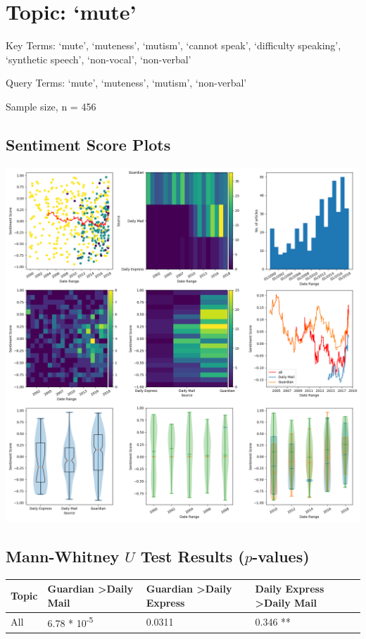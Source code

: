\documentclass{report}
\begin{document}
\newpage
\section{Topic: `mute'}
Key Terms: `mute', `muteness', `mutism', `cannot speak', `difficulty speaking', `synthetic speech', `non-vocal', `non-verbal'

\noindent Query Terms: `mute', `muteness', `mutism', `non-verbal'

\noindent Sample size, n = 456

\subsection{Sentiment Score Plots}
\includegraphics[width=\textwidth]{raw/mute.png}

\subsection{Mann-Whitney $U$ Test Results ($p$-values)}
\noindent
\begin{tabu} to \textwidth { | X[c] | X[c] | X[c] | X[c] | }  
	\hline
	Topic & Guardian \textgreater\space Daily Mail & Guardian \textgreater\space Daily Express & Daily Express \textgreater\space Daily Mail  \\
	\hline
	All & 6.78 * 10\textsuperscript{-5} & 0.0311 & 0.346 **  \\
	\hline
\end{tabu}
\end{document}
